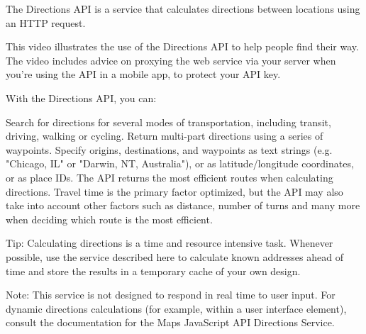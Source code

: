 The Directions API is a service that calculates directions between locations using an HTTP request.

This video illustrates the use of the Directions API to help people find their way. The video includes advice on proxying the web service via your server when you're using the API in a mobile app, to protect your API key.


With the Directions API, you can:

Search for directions for several modes of transportation, including transit, driving, walking or cycling.
Return multi-part directions using a series of waypoints.
Specify origins, destinations, and waypoints as text strings (e.g. "Chicago, IL" or "Darwin, NT, Australia"), or as latitude/longitude coordinates, or as place IDs.
The API returns the most efficient routes when calculating directions. Travel time is the primary factor optimized, but the API may also take into account other factors such as distance, number of turns and many more when deciding which route is the most efficient.

Tip: Calculating directions is a time and resource intensive task. Whenever possible, use the service described here to calculate known addresses ahead of time and store the results in a temporary cache of your own design.

Note: This service is not designed to respond in real time to user input. For dynamic directions calculations (for example, within a user interface element), consult the documentation for the Maps JavaScript API Directions Service.
